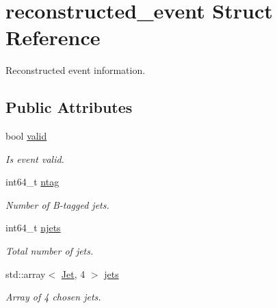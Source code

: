 \hypertarget{structreconstructed__event}{}\section{reconstructed\+\_\+event Struct Reference}
\label{structreconstructed__event}


Reconstructed event information.  


\subsection*{Public Attributes}
\begin{DoxyCompactItemize}
\item 
\mbox{\label{structreconstructed__event_a94cc061a3f41856479d8b1b869b11650}} 
bool \mbox{\hyperlink{structreconstructed__event_a94cc061a3f41856479d8b1b869b11650}{valid}}
\begin{DoxyCompactList}\small\item\em Is event valid. \end{DoxyCompactList}\item 
\mbox{\label{structreconstructed__event_a292788abeb76ddb0dbfb92f664ffefd5}} 
int64\+\_\+t \mbox{\hyperlink{structreconstructed__event_a292788abeb76ddb0dbfb92f664ffefd5}{ntag}}
\begin{DoxyCompactList}\small\item\em Number of B-\/tagged jets. \end{DoxyCompactList}\item 
\mbox{\label{structreconstructed__event_a64eb83b3b16fd0ffe846960ad21e7dca}} 
int64\+\_\+t \mbox{\hyperlink{structreconstructed__event_a64eb83b3b16fd0ffe846960ad21e7dca}{njets}}
\begin{DoxyCompactList}\small\item\em Total number of jets. \end{DoxyCompactList}\item 
\mbox{\label{structreconstructed__event_a8214199f9df512f0c536e6de41de439a}} 
std\+::array$<$ \mbox{\hyperlink{classJet}{Jet}}, 4 $>$ \mbox{\hyperlink{structreconstructed__event_a8214199f9df512f0c536e6de41de439a}{jets}}
\begin{DoxyCompactList}\small\item\em Array of 4 chosen jets. \end{DoxyCompactList}\item 

\end{DoxyCompactItemize}
